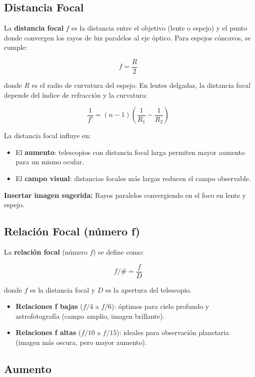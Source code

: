 \subsection{Distancia Focal}
\label{subsec:dist_focal}

La \textbf{distancia focal} $f$ es la distancia entre el objetivo (lente o espejo) y el punto donde convergen los rayos de luz paralelos al eje óptico. Para espejos cóncavos, se cumple:

\[
f = \frac{R}{2}
\]

donde $R$ es el radio de curvatura del espejo. En lentes delgadas, la distancia focal depende del índice de refracción y la curvatura:

\[
\frac{1}{f'} = (n - 1) \left( \frac{1}{R_1} - \frac{1}{R_2} \right)
\]

La distancia focal influye en:

\begin{itemize}
	\item El \textbf{aumento}: telescopios con distancia focal larga permiten mayor aumento para un mismo ocular.
	\item El \textbf{campo visual}: distancias focales más largas reducen el campo observable.
\end{itemize}

\vspace{0.3cm}
\textbf{Insertar imagen sugerida:} Rayos paralelos convergiendo en el foco en lente y espejo.

\subsection{Relación Focal (número f)}
\label{subsec:rel_focal}

La \textbf{relación focal} (número $f$) se define como:

\[
f/\# = \frac{f}{D}
\]

donde $f$ es la distancia focal y $D$ es la apertura del telescopio.

\begin{itemize}
	\item \textbf{Relaciones f bajas} ($f/4$ a $f/6$): óptimos para cielo profundo y astrofotografía (campo amplio, imagen brillante).
	\item \textbf{Relaciones f altas} ($f/10$ a $f/15$): ideales para observación planetaria (imagen más oscura, pero mayor aumento).
\end{itemize}

\subsection{Aumento}
\label{subse:aumento_resolucion}

